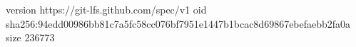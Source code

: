 version https://git-lfs.github.com/spec/v1
oid sha256:94edd00986bb81c7a5fc58cc076bf7951e1447b1bcac8d69867ebefaebb2fa0a
size 236773
